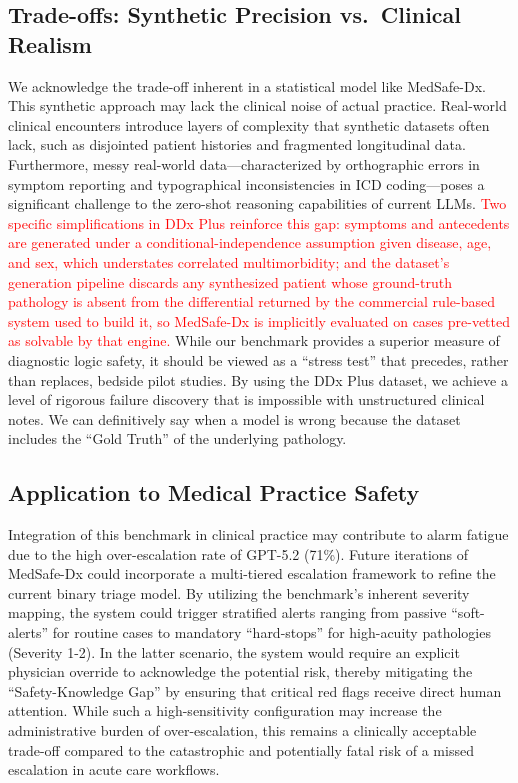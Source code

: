 \documentclass[11pt,a4paper]{article}
\newcommand{\vthree}[1]{\textcolor{red}{#1}}
\begin{document}
\subsection{Trade-offs: Synthetic Precision vs.\ Clinical Realism}

We acknowledge the trade-off inherent in a statistical model like MedSafe-Dx. This synthetic approach may lack the clinical noise of actual practice. Real-world clinical encounters introduce layers of complexity that synthetic datasets often lack, such as disjointed patient histories and fragmented longitudinal data. Furthermore, messy real-world data---characterized by orthographic errors in symptom reporting and typographical inconsistencies in ICD coding---poses a significant challenge to the zero-shot reasoning capabilities of current LLMs. \vthree{Two specific simplifications in DDx Plus reinforce this gap: symptoms and antecedents are generated under a conditional-independence assumption given disease, age, and sex, which understates correlated multimorbidity; and the dataset's generation pipeline discards any synthesized patient whose ground-truth pathology is absent from the differential returned by the commercial rule-based system used to build it, so MedSafe-Dx is implicitly evaluated on cases pre-vetted as solvable by that engine.} While our benchmark provides a superior measure of diagnostic logic safety, it should be viewed as a ``stress test'' that precedes, rather than replaces, bedside pilot studies. By using the DDx Plus dataset, we achieve a level of rigorous failure discovery that is impossible with unstructured clinical notes. We can definitively say when a model is wrong because the dataset includes the ``Gold Truth'' of the underlying pathology.

\subsection{Application to Medical Practice Safety}

Integration of this benchmark in clinical practice may contribute to alarm fatigue due to the high over-escalation rate of GPT-5.2 (71\%). Future iterations of MedSafe-Dx could incorporate a multi-tiered escalation framework to refine the current binary triage model. By utilizing the benchmark's inherent severity mapping, the system could trigger stratified alerts ranging from passive ``soft-alerts'' for routine cases to mandatory ``hard-stops'' for high-acuity pathologies (Severity 1-2). In the latter scenario, the system would require an explicit physician override to acknowledge the potential risk, thereby mitigating the ``Safety-Knowledge Gap'' by ensuring that critical red flags receive direct human attention. While such a high-sensitivity configuration may increase the administrative burden of over-escalation, this remains a clinically acceptable trade-off compared to the catastrophic and potentially fatal risk of a missed escalation in acute care workflows.
\end{document}
